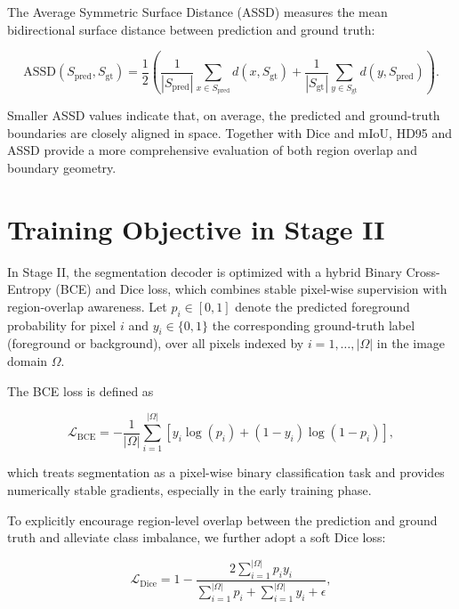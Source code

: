 \documentclass{article} %
\begin{document}
The Average Symmetric Surface Distance (ASSD) measures the mean bidirectional surface distance between prediction and ground truth:

\begin{equation}
\mathrm{ASSD}(S_{\mathrm{pred}}, S_{\mathrm{gt}}) =
\frac{1}{2}\left(
\frac{1}{|S_{\mathrm{pred}}|}\sum_{x\in S_{\mathrm{pred}}} d(x,S_{\mathrm{gt}})
+
\frac{1}{|S_{\mathrm{gt}}|}\sum_{y\in S_{\mathrm{gt}}} d(y,S_{\mathrm{pred}})
\right).
\end{equation}

Smaller ASSD values indicate that, on average, the predicted and ground-truth boundaries are closely aligned in space. Together with Dice and mIoU, HD95 and ASSD provide a more comprehensive evaluation of both region overlap and boundary geometry.

\section{Training Objective in Stage II}
\label{sec:Loss}

In Stage II, the segmentation decoder is optimized with a hybrid Binary Cross-Entropy (BCE) and Dice loss, which combines stable pixel-wise supervision with region-overlap awareness. Let $p_i \in [0,1]$ denote the predicted foreground probability for pixel $i$ and $y_i \in \{0,1\}$ the corresponding ground-truth label (foreground or background), over all pixels indexed by $i=1,\dots,|\Omega|$ in the image domain $\Omega$.

The BCE loss is defined as

\begin{equation}
\mathcal{L}_{\mathrm{BCE}}
= - \frac{1}{|\Omega|}
\sum_{i=1}^{|\Omega|}
\left[
y_i \log(p_i) + (1-y_i)\log(1-p_i)
\right],
\end{equation}

which treats segmentation as a pixel-wise binary classification task and provides numerically stable gradients, especially in the early training phase.

To explicitly encourage region-level overlap between the prediction and ground truth and alleviate class imbalance, we further adopt a soft Dice loss:

\begin{equation}
\mathcal{L}_{\mathrm{Dice}}
= 1 - 
\frac{2 \sum_{i=1}^{|\Omega|} p_i y_i}
{\sum_{i=1}^{|\Omega|} p_i + \sum_{i=1}^{|\Omega|} y_i + \epsilon},
\end{equation}
\end{document}
